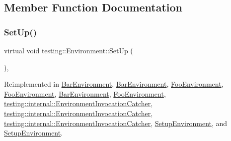\subsection{Member Function Documentation}
\mbox{\label{classtesting_1_1_environment_a1bf8cafaa9d4eba9feb98655ee434eb3}} 
\subsubsection{\texorpdfstring{SetUp()}{SetUp()}\hspace{0.1cm}{\footnotesize\ttfamily [1/3]}}
{\footnotesize\ttfamily virtual void testing\+::\+Environment\+::\+Set\+Up (\begin{DoxyParamCaption}{ }\end{DoxyParamCaption})\hspace{0.3cm}{\ttfamily [inline]}, {\ttfamily [virtual]}}



Reimplemented in \mbox{\hyperlink{class_bar_environment_a8c525317fe8067f5000475cf4689da09}{Bar\+Environment}}, \mbox{\hyperlink{class_bar_environment_a8c525317fe8067f5000475cf4689da09}{Bar\+Environment}}, \mbox{\hyperlink{class_foo_environment_abf6a0edbb3be025e9f143a7a1b89f9dd}{Foo\+Environment}}, \mbox{\hyperlink{class_foo_environment_abf6a0edbb3be025e9f143a7a1b89f9dd}{Foo\+Environment}}, \mbox{\hyperlink{class_bar_environment_a88e17c5dd1dcea7a4538f2f3c6bf7bdd}{Bar\+Environment}}, \mbox{\hyperlink{class_foo_environment_a7db8d8b312805aff437ae8534132a56d}{Foo\+Environment}}, \mbox{\hyperlink{classtesting_1_1internal_1_1_environment_invocation_catcher_a95400d20847acd38742ba372f87240dc}{testing\+::internal\+::\+Environment\+Invocation\+Catcher}}, \mbox{\hyperlink{classtesting_1_1internal_1_1_environment_invocation_catcher_a95400d20847acd38742ba372f87240dc}{testing\+::internal\+::\+Environment\+Invocation\+Catcher}}, \mbox{\hyperlink{classtesting_1_1internal_1_1_environment_invocation_catcher_a325365b0ecfa71a4a767d7a1817c9663}{testing\+::internal\+::\+Environment\+Invocation\+Catcher}}, \mbox{\hyperlink{class_setup_environment_a02995e3c2581a49c9dd0526d80072b38}{Setup\+Environment}}, and \mbox{\hyperlink{class_setup_environment_a02995e3c2581a49c9dd0526d80072b38}{Setup\+Environment}}.

\mbox{\label{classtesting_1_1_environment_a6096a69b03f6eb727a69a39f854cc87b}} 
